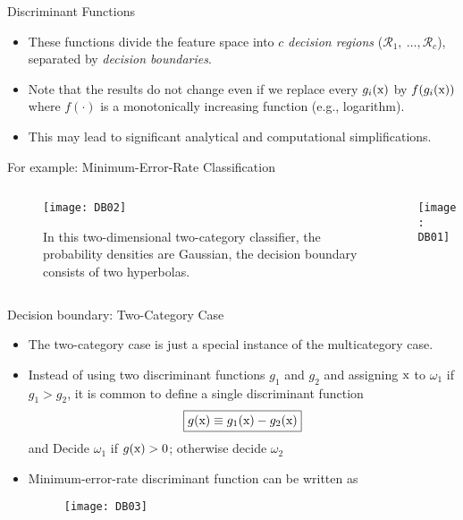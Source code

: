 \begin{frame}{Discriminant Functions}
\begin{itemize}
\setlength{\itemsep}{6pt}
\item These functions divide the feature space into $c$ \textit{\color{mycolor2}decision regions} ($\mathcal{R}_1,~\ldots,\mathcal{R}_c$), separated by \textit{\color{mycolor2}decision boundaries}.
\item Note that the results do not change even if we replace every $g_i(\rm x)$ by $f(g_i(\rm x))$ where $f(\cdot)$ is a monotonically increasing function (e.g., logarithm).
\item This may lead to significant analytical and computational simplifications.
\end{itemize}
\end{frame}

\begin{frame}{For example: Minimum-Error-Rate Classification}
\vspace{-12pt}
\begin{columns}
\begin{column}{6cm}
\begin{figure}
\texttt{[image: DB02]}
\caption{In this two-dimensional two-category classifier, the probability densities are Gaussian, the decision boundary consists of two hyperbolas.}
\end{figure}
\end{column}
\begin{column}{5cm}
\texttt{[image: DB01]}
\end{column}
\end{columns}
\end{frame}

\begin{frame}{Decision boundary: Two-Category Case}
\begin{itemize}
\item The two-category case is just a special instance of the multicategory case.
\item Instead of using two discriminant functions $g_1$ and $g_2$ and assigning ${\rm x}$ to $\omega_1$ if $g_1>g_2$, it is common to define a single discriminant function
\begin{equation}
\boxed{g({\rm x}) \equiv g_1({\rm x})-g_2({\rm x})\nonumber}
\end{equation}
and Decide $\omega_1$ if $g({\rm x})>0$; otherwise decide $\omega_2$
\item Minimum-error-rate discriminant function can be written as
\begin{figure}
\texttt{[image: DB03]}
\end{figure}
\end{itemize}
\end{frame}
